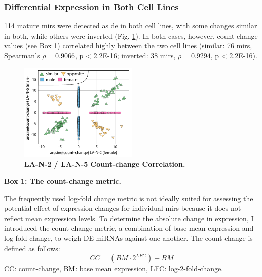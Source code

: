 \subsubsection{Differential Expression in Both Cell Lines}


114 mature \acp{mir} were detected as \ac{de} in both cell lines, with some changes similar in both, while others were inverted (Fig. \ref{fig:countchangecor}). In both cases, however, count-change values (see Box 1) correlated highly between the two cell lines (similar: 76 \acp{mir}, Spearman’s $\rho = 0.9066$, p < 2.2E-16; inverted: 38 \acp{mir}, $\rho = 0.9294$, p < 2.2E-16).

\begin{figure}
\centering
\includegraphics[width=0.5\textwidth]{figures/countchangecor}
\caption[LA-N-2 / LA-N-5 Count-change Correlation.]{\textbf{LA-N-2 / LA-N-5 Count-change Correlation.}
\label{fig:countchangecor}}
\end{figure}

\begin{shaded}
\textbf{Box 1: The count-change metric.}

The frequently used log-fold change metric is not ideally suited for assessing the potential effect of expression changes for individual \acp{mir} because it does not reflect mean expression levels. To determine the absolute change in expression, I introduced the count-change metric, a combination of base mean expression and log-fold change, to weigh DE miRNAs against one another. The count-change is defined as follows: $$CC = (BM \cdot 2^{LFC}) - BM$$
CC: count-change, BM: base mean expression, LFC: log-2-fold-change.
\end{shaded}

